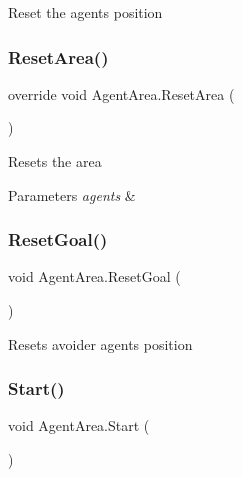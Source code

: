 Reset the agents position 

\mbox{\label{class_agent_area_a99721d7bcaa1fb9dbd06ce797fe446c9}} 
\subsubsection{\texorpdfstring{ResetArea()}{ResetArea()}}
{\footnotesize\ttfamily override void Agent\+Area.\+Reset\+Area (\begin{DoxyParamCaption}{ }\end{DoxyParamCaption})}



Resets the area 


\begin{DoxyParams}{Parameters}
{\em agents} & \\
\hline
\end{DoxyParams}
\mbox{\label{class_agent_area_aa575658613c279698f0edd6e75773f49}} 
\subsubsection{\texorpdfstring{ResetGoal()}{ResetGoal()}}
{\footnotesize\ttfamily void Agent\+Area.\+Reset\+Goal (\begin{DoxyParamCaption}{ }\end{DoxyParamCaption})\hspace{0.3cm}{\ttfamily [private]}}



Resets avoider agents position 

\mbox{\label{class_agent_area_a0a2c9d32291c1ec805a5e1f87c1f3edb}} 
\subsubsection{\texorpdfstring{Start()}{Start()}}
{\footnotesize\ttfamily void Agent\+Area.\+Start (\begin{DoxyParamCaption}{ }\end{DoxyParamCaption})\hspace{0.3cm}{\ttfamily [private]}}



